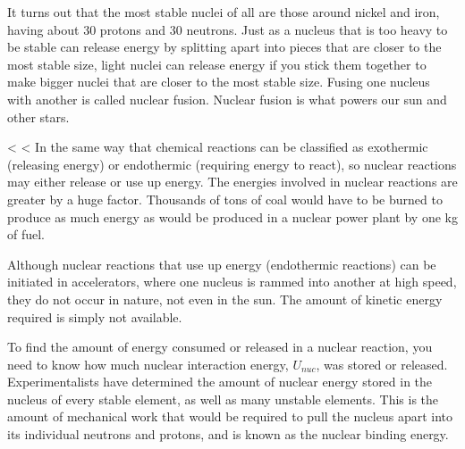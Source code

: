         It turns out that the most stable nuclei of all are those
        around nickel and iron, having about 30 protons and 30
        neutrons. Just as a nucleus that is too heavy to be stable
        can release energy by splitting apart into pieces that are
        closer to the most stable size, light nuclei can release
        energy if you stick them together to make bigger nuclei that
        are closer to the most stable size. Fusing one nucleus with
        another is called nuclear fusion. Nuclear fusion is what
        powers our sun and other stars.

<%
<%
        In the same way that chemical reactions can be classified as
        exothermic (releasing energy) or endothermic (requiring
        energy to react), so nuclear reactions may either release or
        use up energy. The energies involved in nuclear reactions
        are greater by a huge factor. Thousands of tons of coal
        would have to be burned to produce as much energy as would
        be produced in a nuclear power plant by one kg of fuel.

        Although nuclear reactions that use up energy (endothermic
        reactions) can be initiated in accelerators, where one
        nucleus is rammed into another at high speed, they do not
        occur in nature, not even in the sun. The amount of kinetic
        energy required is simply not available.

        To find the amount of energy consumed or released in a
        nuclear reaction, you need to know how much nuclear interaction energy, $U_{nuc}$,
        was stored or released. Experimentalists have determined the
        amount of nuclear energy stored in the nucleus of every
        stable element, as well as many unstable elements. This is
        the amount of mechanical work that would be required to pull
        the nucleus apart into its individual neutrons and protons,
        and is known as the nuclear binding energy.

